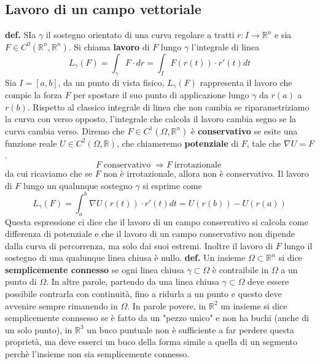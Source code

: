 \subsection*{Lavoro di un campo vettoriale}
\textbf{def.} SIa $\gamma$ il sostegno orientato di una curva regolare a tratti $r: I \rightarrow \mathbb{R}^n$ e sia $F \in C ^0(\mathbb{R}^n, \mathbb{R}^n)$. Si chiama \textbf{lavoro} di $F$ lungo $\gamma$ l'integrale di linea
\[
    L_\gamma (F) = \int_{\gamma} F \cdot dr = \int_{I} F(r(t))\cdot r'(t) dt
\]
Sia $I = [a,b]$, da un punto di vista fisico, $L_\gamma(F)$ rappresenta il lavoro che compie la forza $F$ per spostare il suo punto di applicazione lungo $\gamma$ da $r(a)$ a $r(b)$.\newline
Rispetto al classico integrale di linea che non cambia se riparametriziamo la curva con verso opposto, l'integrale che calcola il lavoro cambia segno se la curva cambia verso.\newline
\newline
Diremo che $F \in C^1(\Omega, \mathbb{R}^n)$ è \textbf{conservativo} se esite una funzione reale $U \in C^2(\Omega, \mathbb{R})$, che chiameremo \textbf{potenziale} di $F$, tale che $\nabla U = F$.\newline
\newline
\[
    F \; \text{conservativo}\; \Longrightarrow F \; \text{irrotazionale}\;
\]
da cui ricaviamo che se $F$ non è irrotazionale, allora non è conservativo.\newline
\newline
Il lavoro di $F$ lungo un qualunque sostegno $\gamma$ si esprime come
\[
    L_\gamma(F) = \int_{a}^{b}\nabla U(r(t)) \cdot r'(t) dt = U(r(b)) - U(r(a))
\]
Questa espressione ci dice che il lavoro di un campo conservativo si calcola come differenza di potenziale e che il lavoro di un campo conservativo non dipende dalla curva di percorrenza, ma solo dai suoi estremi. Inoltre il lavoro di $F$ lungo il sostegno di una qualunque linea chiusa è nullo.\newline
\newline
\textbf{def.} Un insieme $\Omega \subset \mathbb{R}^n$ si dice \textbf{semplicemente connesso} se ogni linea chiusa $\gamma \subset \Omega$ è contraibile in $\Omega$ a un punto di $\Omega$. In altre parole, partendo da una linea chiusa $\gamma \subset \Omega$ deve essere possibile contrarla con continuità, fino a ridurla a un punto e questo deve avvenire sempre rimanendo in $\Omega$.\newline
In parole povere, in $\mathbb{R}^2$ un insieme si dice semplicemente connsesso se è fatto da un "pezzo unico" e non ha buchi (anche di un solo punto), in $\mathbb{R}^3$ un buco puntuale non è sufficiente a far perdere questa proprietà, ma deve esserci un buco della forma simile a quella di un segmento perchè l'insieme non sia semplicemente connesso.\newline
